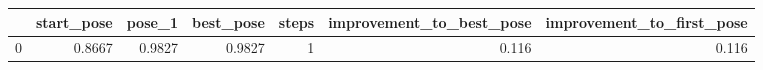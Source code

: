 \begin{tabular}{lrrrrrr}
\toprule
{} &  start\_pose &  pose\_1 &  best\_pose &  steps &  improvement\_to\_best\_pose &  improvement\_to\_first\_pose \\
\midrule
0 &      0.8667 &  0.9827 &     0.9827 &      1 &                     0.116 &                      0.116 \\
\bottomrule
\end{tabular}
